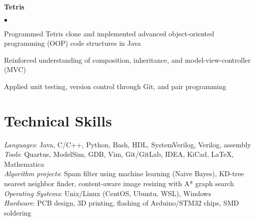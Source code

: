 \documentclass[margin,line]{res}
\newenvironment{list2}{
  \begin{list}{$\bullet$}{%
      \setlength{\itemsep}{0in}
      \setlength{\parsep}{0in} \setlength{\parskip}{0in}
      \setlength{\topsep}{0in} \setlength{\partopsep}{0in} 
      \setlength{\leftmargin}{0.2in}}}{\end{list}}
\begin{document}
\begin{resume}
{\bf Tetris} %
\begin{list2}
\item Programmed Tetris clone and implemented advanced object-oriented programming (OOP) code structures in Java
\item Reinforced understanding of composition, inheritance, and model-view-controller (MVC)
\item Applied unit testing, version control through Git, and pair programming
\end{list2}


\vspace{-.2cm}
\section{\sc Technical Skills} 

	{\em Languages}:  
	Java, C/C++, Python, Bash, HDL, SystemVerilog, Verilog, assembly
	\\
	{\em Tools}:  
	Quartus, ModelSim, GDB, Vim, Git/GitLab, IDEA, KiCad, \LaTeX, Mathematica 
	\\
	{\em Algorithm projects}: 
	Spam filter using machine learning (Naive Bayes), KD-tree
	nearest neighbor finder, content-aware image resizing with A* graph search
	\\
	{\em Operating Systems}:  
	Unix/Linux (CentOS, Ubuntu, WSL), Windows
	\\
	{\em Hardware}:  PCB design, 3D printing, flashing of Arduino/STM32 chips, SMD soldering
	\\



\end{resume}
\end{document}
